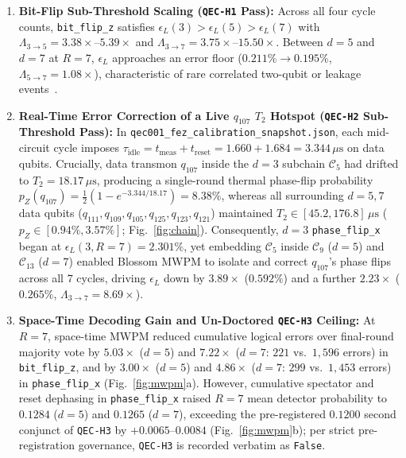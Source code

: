 \documentclass[11pt,twocolumn]{article}
\begin{document}
\begin{enumerate}
\item \textbf{Bit-Flip Sub-Threshold Scaling (\texttt{QEC-H1} Pass):} Across all four cycle counts, \texttt{bit\_flip\_z} satisfies $\epsilon_L(3) > \epsilon_L(5) > \epsilon_L(7)$ with $\Lambda_{3\to 5}=3.38\times\text{--}5.39\times$ and $\Lambda_{3\to 7}=3.75\times\text{--}15.50\times$. Between $d=5$ and $d=7$ at $R=7$, $\epsilon_L$ approaches an error floor ($0.211\% \to 0.195\%$, $\Lambda_{5\to 7}=1.08\times$), characteristic of rare correlated two-qubit or leakage events~\cite{GoogleRepCode2021}.
\item \textbf{Real-Time Error Correction of a Live $q_{107}$ $T_2$ Hotspot (\texttt{QEC-H2} Sub-Threshold Pass):} In \texttt{qec001\_fez\_calibration\_snapshot.json}, each mid-circuit cycle imposes $\tau_{\mathrm{idle}} = t_{\mathrm{meas}} + t_{\mathrm{reset}} = 1.660 + 1.684 = 3.344\,\mu\text{s}$ on data qubits. Crucially, data transmon $q_{107}$ inside the $d=3$ subchain $\mathcal{C}_5$ had drifted to $T_2 = 18.17\,\mu\text{s}$, producing a single-round thermal phase-flip probability $p_Z(q_{107}) = \frac{1}{2}(1 - e^{-3.344/18.17}) = 8.38\%$, whereas all surrounding $d=5, 7$ data qubits ($q_{111}, q_{109}, q_{105}, q_{125}, q_{123}, q_{121}$) maintained $T_2 \in [45.2, 176.8]\,\mu\text{s}$ ($p_Z \in [0.94\%, 3.57\%]$; Fig.~\ref{fig:chain}). Consequently, $d=3$ \texttt{phase\_flip\_x} began at $\epsilon_L(3, R=7) = 2.301\%$, yet embedding $\mathcal{C}_5$ inside $\mathcal{C}_9$ ($d=5$) and $\mathcal{C}_{13}$ ($d=7$) enabled Blossom MWPM to isolate and correct $q_{107}$'s phase flips across all $7$ cycles, driving $\epsilon_L$ down by $3.89\times$ ($0.592\%$) and a further $2.23\times$ ($0.265\%$, $\Lambda_{3\to 7}=8.69\times$).
\item \textbf{Space-Time Decoding Gain and Un-Doctored \texttt{QEC-H3} Ceiling:} At $R=7$, space-time MWPM reduced cumulative logical errors over final-round majority vote by $5.03\times$ ($d=5$) and $7.22\times$ ($d=7$: $221$ vs.\ $1{,}596$ errors) in \texttt{bit\_flip\_z}, and by $3.00\times$ ($d=5$) and $4.86\times$ ($d=7$: $299$ vs.\ $1{,}453$ errors) in \texttt{phase\_flip\_x} (Fig.~\ref{fig:mwpm}a). However, cumulative spectator and reset dephasing in \texttt{phase\_flip\_x} raised $R=7$ mean detector probability to $0.1284$ ($d=5$) and $0.1265$ ($d=7$), exceeding the pre-registered $0.1200$ second conjunct of \texttt{QEC-H3} by $+0.0065\text{--}0.0084$ (Fig.~\ref{fig:mwpm}b); per strict pre-registration governance, \texttt{QEC-H3} is recorded verbatim as \texttt{False}.
\end{enumerate}
\end{document}
